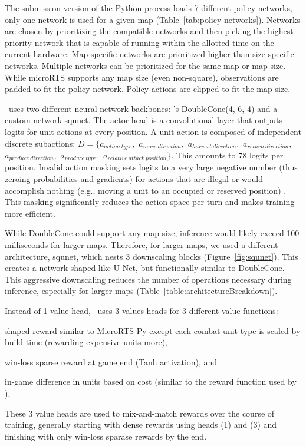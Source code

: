 \documentclass{article}
\begin{document}
The submission version of the Python process loads 7 different policy networks, only one network is used
for a given map (Table~\ref{tab:policy-networks}). Networks are chosen by prioritizing
the compatible networks and then picking the highest priority network that is capable of
running within the allotted time on the current hardware. Map-specific networks are
prioritized higher than size-specific networks. Multiple networks can be prioritized for
the same map or map size. While microRTS supports any map size (even non-square),
observations are padded to fit the policy network. Policy actions are clipped to fit the
map size.

\agentName\ uses two different neural network backbones:
\citet{Ferdinand2021doublecone}'s DoubleCone(4, 6, 4) and a custom network
squnet. The actor head is a convolutional layer
that outputs logits for unit actions at every position. A unit action is composed of
independent discrete subactions: $D = \{a_{action\ type},$ $a_{move\ direction},$ $a_{harvest\
direction},$ $a_{return\ direction},$ $a_{produce\ direction},$ $a_{produce\ type},$ $a_{relative\
attack\ position}\}$. This amounts to 78 logits per position. Invalid action masking sets
logits to a very large negative number (thus zeroing probabilities and gradients) for actions that are
illegal or would accomplish nothing (e.g., moving a unit to an occupied or reserved
position) \citep{DBLP:journals/corr/abs-2006-14171}. This masking significantly reduces
the action space per turn and makes training more efficient.

While DoubleCone could support any map size, inference would likely exceed 100
milliseconds for larger maps. Therefore, for larger maps, we used a different
architecture, squnet, which nests 3 downscaling blocks (Figure~\ref{fig:squnet}). This 
creates a network shaped like U-Net, but functionally similar to DoubleCone.
This aggressive downscaling reduces the number of operations necessary during inference,
especially for larger maps (Table~\ref{table:architectureBreakdown}).

Instead of 1 value head, \agentName\ uses 3 values heads for 3 different value
functions:
\begin{inparaenum}[(1)]
    \item shaped reward similar to MicroRTS-Py except each combat unit type is
    scaled by build-time (rewarding expensive units more),
    \item win-loss sparse reward at game end (Tanh activation), and
    \item in-game difference in units based on cost (similar to the reward function used
    by \citet{Winter2021}).
\end{inparaenum}
These 3 value heads are used to mix-and-match rewards over the course of training,
generally starting with dense rewards using heads (1) and (3) and finishing with only
win-loss sparase rewards by the end.
\end{document}
